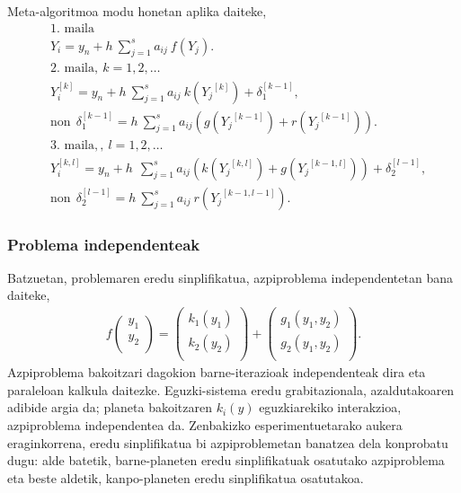 Meta-algoritmoa modu honetan aplika daiteke,
\begin{align*}
&\mbox{1. maila}\\ 
&Y_i=y_n+h \ \sum^s_{j=1}{a_{ij} \ f(Y_j)}.\\
&\mbox{2. maila}, \ k=1,2,\dots\\
&Y_i^{[k]}=y_n+h\  \sum^s_{j=1}{a_{ij} \ k({Y_j}^{[k]})}+ \delta_1^{[k-1]},\\
& \text{non} \ \ \delta_1^{[k-1]}= h\  \sum^s_{j=1}{a_{ij} (g({Y_j}^{[k-1]})+r({Y_j}^{[k-1]}))}. \\
&\mbox{3. maila}, , \ l=1,2,\dots\\
&Y_i^{[k,l]}=y_n+h\ \ \sum^s_{j=1}{a_{ij} \left(k({Y_j}^{[k,l]})+g({Y_j}^{[k-1,l]})\right)}+\delta_2^{[l-1]}, \\
& \text{non} \ \ \delta_2^{[l-1]}= h \ \sum^s_{j=1}{a_{ij} \ r({Y_j}^{[k-1,l-1]})}.
\end{align*}


\subsubsection*{Problema independenteak}

Batzuetan, problemaren eredu sinplifikatua, azpiproblema independentetan bana daiteke,
\begin{align*}
f\left ( \begin{array}{c}
   y_1 \\
   y_2 \\
\end{array} \right)=
\left ( \begin{array}{c}
   k_1(y_1) \\
   k_2(y_2) \\
\end{array} \right)+
\left ( \begin{array}{c}
   g_1(y_1,y_2) \\
   g_2(y_1,y_2) \\
\end{array} \right).
\end{align*}
%
Azpiproblema bakoitzari dagokion barne-iterazioak independenteak dira eta paraleloan kalkula daitezke. Eguzki-sistema eredu grabitazionala, azaldutakoaren adibide argia da; planeta bakoitzaren $k_i(y)$ eguzkiarekiko interakzioa, azpiproblema independentea da. Zenbakizko esperimentuetarako aukera eraginkorrena, eredu sinplifikatua bi azpiproblemetan banatzea dela konprobatu dugu: alde batetik, barne-planeten eredu sinplifikatuak osatutako azpiproblema eta beste aldetik, kanpo-planeten eredu sinplifikatua osatutakoa.    

